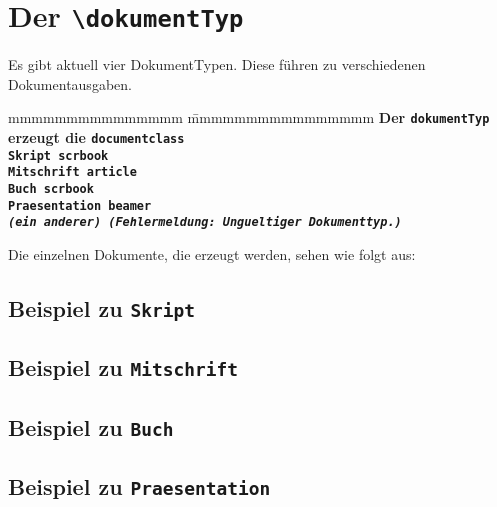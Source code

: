 		\section{Der \texttt{\textbackslash dokumentTyp}}
			Es gibt aktuell vier DokumentTypen. Diese führen zu verschiedenen Dokumentausgaben.
			\begin{tabbing}
				mmmmmmmmmmmmmmm				\= mmmmmmmmmmmmmmmm 				 \kill
				\bf Der \texttt{dokumentTyp}\ellipse 	
											\> \bf \ellipse erzeugt die \texttt{documentclass} \\ 
				\tt Skript					\> \tt scrbook\\
				\tt Mitschrift				\> \tt article \\
				\tt Buch					\> \tt scrbook \\
				\tt Praesentation			\> \tt beamer \\
				\emph{(ein anderer)}		\> \em (Fehlermeldung: Ungueltiger Dokumenttyp.)
			\end{tabbing}
		Die einzelnen Dokumente, die erzeugt werden, sehen wie folgt aus:
		
		
		\begin{center}
			\vspace*{20em}
			\subsection{Beispiel zu \tt Skript}
		\end{center}
		\newpage
		
		\begin{center}
			\vspace*{20em}
			\subsection{Beispiel zu \tt Mitschrift}
		\end{center}
		\newpage
		
		\begin{center}
			\vspace*{20em}
			\subsection{Beispiel zu \tt Buch}
		\end{center}
		\newpage
		
		\begin{center}
			\vspace*{20em}
			\subsection{Beispiel zu \tt Praesentation}
		\end{center}
		\newpage



